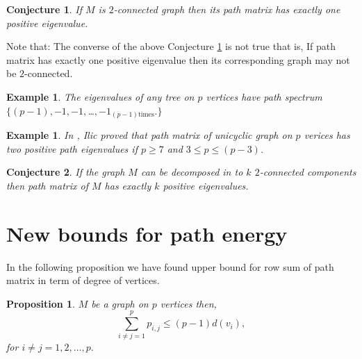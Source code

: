 \documentclass{article}
\newtheorem{example}[theorem]{Example}
\newtheorem{proposition}[theorem]{Proposition}
\newtheorem*{open problem*}{Open Problem}
\newtheorem{conjecture}{Conjecture}
\begin{document}
	\begin{conjecture}\label{conjecture1}
		If $M$ is $2$-connected graph then its path matrix has exactly one positive eigenvalue.  
	\end{conjecture}
	Note that: The converse of the above Conjecture \ref{conjecture1} is not true that is, If path matrix has exactly one positive eigenvalue then its corresponding graph may not be $2$-connected.  
	\begin{example}
		The eigenvalues of any tree on $p$ vertices have path spectrum $\{(p-1),-1, -1,$\ldots$,-1_{(p-1) \text{times}}.\}$
	\end{example}
	\begin{example}
		In \cite{Aleksandar Ilic}, Ilic proved that path matrix of unicyclic graph on $p$ verices has two positive path eigenvalues if $p\geq 7$ and $3\leq p \leq (p-3)$. 
	\end{example}
	
	\begin{conjecture}\label{Conjecture2}
		If the graph $M$ can be decomposed in to $k$  $2$-connected components then path matrix of $M$ has exactly $k$ positive eigenvalues.
	\end{conjecture}
	\section {New bounds for path energy}
	In the following proposition we have found upper bound for row sum of path matrix in term of degree of vertices.  
	\begin{proposition}\label{bounds}
		$M$ be a graph on $p$ vertices then,
		$$\sum_{i\neq j=1}^{p} p_{i,j} \leq (p-1)d(v_i),$$ for $i\neq j=1,2,\dots,p.$
	\end{proposition}
	
\end{document}
